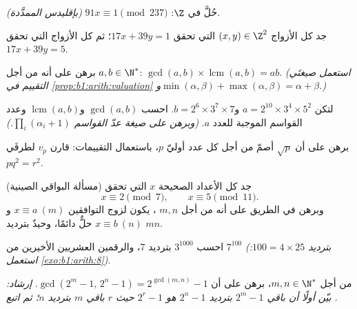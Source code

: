\begin{exercise}[$\star$]\label{exo:b1:arith:3}
حُلَّ في $\Z$: $91x \equiv 1 \pmod{237}$ \emph{(بإقليدس الممدَّدة)}.
\end{exercise}

\begin{exercise}[$\star$]\label{exo:b1:arith:4}
جد كل الأزواج $(x, y) \in \Z^2$ التي تحقق $17x + 39y = 1$؛ ثم كل الأزواج
التي تحقق $17 x + 39 y = 5$.
\end{exercise}

\begin{exercise}[$\star\star$]\label{exo:b1:arith:5}
برهن على أنه من أجل $a, b \in \N^*$: $\gcd(a,b) \times
\operatorname{lcm}(a,b) = ab$. \emph{(استعمل صيغتَي التقييم في
\cref{prop:b1:arith:valuation} و$\min(\alpha,\beta) +
\max(\alpha,\beta) = \alpha + \beta$.)}
\end{exercise}

\begin{exercise}[$\star\star$]\label{exo:b1:arith:6}
لتكن $a = 2^{10} \times 3^4 \times 5^2$ و$b = 2^6 \times 3^7 \times
7$. احسب $\gcd(a, b)$ و$\operatorname{lcm}(a,b)$ وعدد
القواسم الموجبة للعدد $a$. \emph{(وبرهن على صيغة عدّ القواسم
$\prod_i (\alpha_i + 1)$.)}
\end{exercise}

\begin{exercise}[$\star\star$]\label{exo:b1:arith:7}
برهن على أن $\sqrt p$ أصمّ من أجل كل عدد أوليّ $p$، باستعمال
التقييمات: قارن $v_p$ لطرفَي $p q^2 = r^2$.
\end{exercise}

\begin{exercise}[$\star\star$]\label{exo:b1:arith:8}
(مسألة البواقي الصينية) جد كل الأعداد الصحيحة $x$ التي تحقق
\[
x \equiv 2 \pmod 7, \qquad x \equiv 5 \pmod{11}.
\]
وبرهن في الطريق على أنه من أجل $m, n$ ، يكون لزوج التوافقين
$x \equiv a \ (m)$ و $x \equiv b\ (n)$ حلٌّ دائمًا، وحيدٌ
بترديد $mn$.
\end{exercise}

\begin{exercise}[$\star\star$]\label{exo:b1:arith:9}
احسب $3^{1000}$ بترديد $7$، والرقمين العشريين الأخيرين من
$7^{100}$ \emph{(بترديد $100 = 4 \times 25$: استعمل
\cref{exo:b1:arith:8})}.
\end{exercise}

\begin{exercise}[$\star\star\star$]\label{exo:b1:arith:10}
من أجل $m, n \in \N^*$، برهن على أن $\gcd(2^m - 1,\, 2^n - 1) =
2^{\gcd(m,n)} - 1$. \emph{إرشاد: بيّن أولًا أن باقي $2^m
- 1$ بترديد $2^n - 1$ هو $2^r - 1$ حيث $r$ باقي $m$ بترديد
$n$؛ ثم اتبع .}
\end{exercise}

